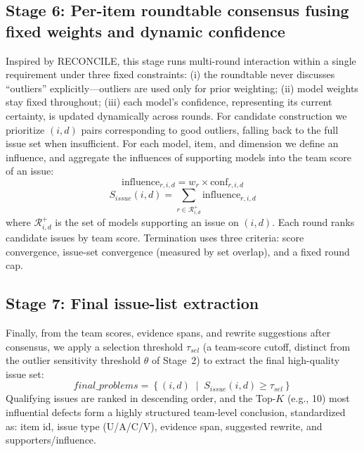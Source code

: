 \documentclass[sn-mathphys-num]{sn-jnl}
\begin{document}
\subsection{Stage 6: Per-item roundtable consensus fusing fixed weights and dynamic confidence}
Inspired by RECONCILE, this stage runs multi-round interaction within a single requirement under three fixed constraints: (i) the roundtable never discusses ``outliers'' explicitly---outliers are used only for prior weighting; (ii) model weights stay fixed throughout; (iii) each model's confidence, representing its current certainty, is updated dynamically across rounds. For candidate construction we prioritize $(i,d)$ pairs corresponding to good outliers, falling back to the full issue set when insufficient. For each model, item, and dimension we define an influence, and aggregate the influences of supporting models into the team score of an issue:
\begin{equation}
\mathrm{influence}_{r,i,d} = w_r \times \mathrm{conf}_{r,i,d}
\label{eq:influence}
\end{equation}
\begin{equation}
S_{issue}(i,d) = \sum_{r \in \mathcal{R}^{+}_{i,d}} \mathrm{influence}_{r,i,d}
\label{eq:Sissue}
\end{equation}
where $\mathcal{R}^{+}_{i,d}$ is the set of models supporting an issue on $(i,d)$. Each round ranks candidate issues by team score. Termination uses three criteria: score convergence, issue-set convergence (measured by set overlap), and a fixed round cap.

\subsection{Stage 7: Final issue-list extraction}
Finally, from the team scores, evidence spans, and rewrite suggestions after consensus, we apply a selection threshold $\tau_{sel}$ (a team-score cutoff, distinct from the outlier sensitivity threshold $\theta$ of Stage~2) to extract the final high-quality issue set:
\begin{equation}
\mathit{final\_problems} = \left\{ (i,d) \;\middle|\; S_{issue}(i,d) \ge \tau_{sel} \right\}
\label{eq:final}
\end{equation}
Qualifying issues are ranked in descending order, and the Top-$K$ (e.g., 10) most influential defects form a highly structured team-level conclusion, standardized as: item id, issue type (U/A/C/V), evidence span, suggested rewrite, and supporters/influence.
\end{document}
